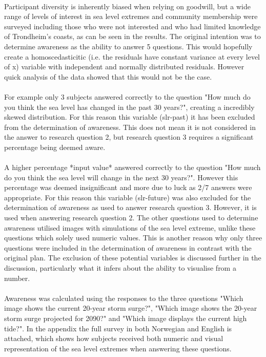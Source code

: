 \paragraph{}
  Participant diversity is inherently biased when relying on goodwill, but a wide range of levels of interest in sea level extremes and community membership were surveyed including those who were not interested and who had limited knowledge of Trondheim’s coasts, as can be seen in the results. The original intention was to determine awareness as the ability to answer 5 questions. This would hopefully create a homoscedasticitic (i.e. the residuals have constant variance at every level of x) variable with independent and normally distributed residuals. However quick analysis of the data showed that this would not be the case.
\paragraph{}
  For example only 3 subjects answered correctly to the question "How much do you think the sea level has changed in the past 30 years?", creating a incredibly skewed distribution. For this reason this variable (slr-past) it has been excluded from the determination of awareness. This does not mean it is not considered in the answer to research question 2, but research question 3 requires a significant percentage being deemed aware. 
\paragraph{}
  A higher percentage *input value* answered correctly to the question "How much do you think the sea level will change in the next 30 years?". However this percentage was deemed insignificant and more due to luck as 2/7 answers were appropriate. For this reason this variable (slr-future) was also excluded for the determination of awareness as used to answer research question 3. However, it is used when answering research question 2. The other questions used to determine awareness utilised images with simulations of the sea level extreme, unlike these questions which solely used numeric values. This is another reason why only three questions were included in the determination of awareness in contrast with the original plan. The exclusion of these potential variables is discussed further in the discussion, particularly what it infers about the ability to visualise from a number. 
\paragraph{}
Awareness was calculated using the responses to the three questions "Which image shows the current 20-year storm surge?", "Which image shows the 20-year storm surge projected for 2090?" and "Which image displays the current high tide?". In the appendix the full survey in both Norwegian and English is attached, which shows how subjects received both numeric and visual representation of the sea level extremes when answering these questions. 

